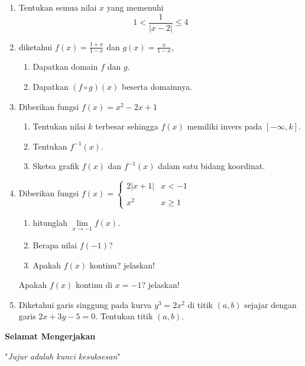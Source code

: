 \documentclass[10pt,openany,a4paper]{article}
\begin{document}
    \begin{enumerate}
	\item Tentukan semua nilai $x$ yang memenuhi
        \[1<\frac{1}{|x-2|}\leq4\]

        \item diketahui $f(x)=\frac{1+x}{1-x}$ dan $g(x)=\frac{x}{1-x}$,
        \begin{enumerate}
            \item Dapatkan domain $f$ dan $g$.
            \item Dapatkan $(f\circ g)(x)$ beserta domainnya.
        \end{enumerate}

        \item Diberikan fungsi $f(x)=x^2-2x+1$
        \begin{enumerate}
            \item Tentukan nilai $k$ terbesar sehingga $f(x)$ memiliki invers pada $[-\infty,k]$.
            \item Tentukan $f^{-1}(x)$.
            \item Sketsa grafik $f(x)$ dan $f^{-1}(x)$ dalam satu bidang koordinat.
        \end{enumerate}

        \item Diberikan fungsi $f(x)=\begin{cases}
        2|x+1|&   x < -1\\
        \\
        x^2 &   x \geq 1
        \end{cases}$
        \begin{enumerate}
            \item hitunglah $\lim\limits_{x\to-1}f(x)$.
            \item Berapa nilai $f(-1)$?
            \item Apakah $f(x)$ kontinu? jelaskan!
        \end{enumerate}
        Apakah $f(x)$ kontinu di $x=-1$? jelaskan!

        \item Diketahui garis singgung pada kurva $y^3=2x^2$ di titik $(a,b)$ sejajar dengan garis $2x+3y-5=0$. Tentukan titik $(a,b)$.
    \end{enumerate}
	
    \vspace*{2cm}
    \hrulefill\textbf{ Selamat Mengerjakan }\hrulefill

    \begin{center}
	"\textit{Jujur adalah kunci kesuksesan}"
    \end{center}
\end{document}
